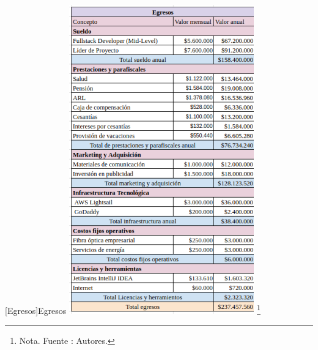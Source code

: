 \vspace{2mm}
    \begin{minipage}{0.9\textwidth}
    \centering
    [{Egresos}]{Egresos}
    \label{egresos}
    \includegraphics[width=0.6\textwidth]{Content/Images/AF/egresos.png}
    \footnote{Nota. \textup{Fuente : Autores.}}
    \end{minipage}